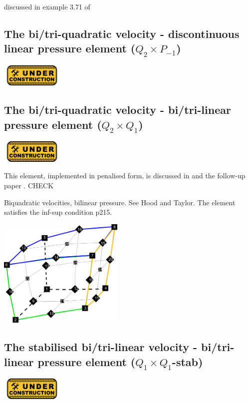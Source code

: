 discussed in example 3.71 of \cite{john16}

\subsection{The bi/tri-quadratic velocity - discontinuous linear pressure element ($Q_2 \times P_{-1}$)}
\includegraphics[width=3cm]{images/under_construction}

\subsection{The bi/tri-quadratic velocity - bi/tri-linear pressure element ($Q_2 \times Q_1$)}
\includegraphics[width=3cm]{images/under_construction}


This element, implemented in penalised form, is discussed in \cite{been79} and the follow-up paper \cite{been80}. CHECK

Biquadratic velocities, bilinear pressure. See Hood and Taylor. The element satisfies the inf-sup condition \cite{hugh}p215. 

\begin{center}
\includegraphics[width=6cm]{images/q2q1/q2numering}
\end{center}


\subsection{The stabilised bi/tri-linear velocity -  bi/tri-linear pressure element ($Q_1\times Q_1$-stab)}
\includegraphics[width=3cm]{images/under_construction}

